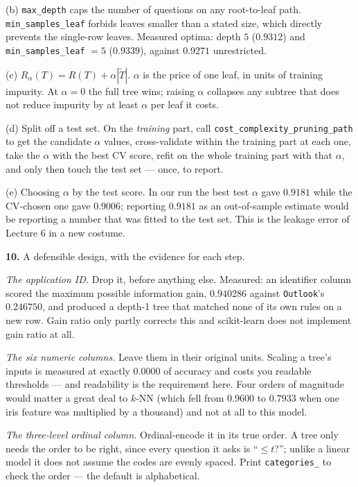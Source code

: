 \documentclass[11pt]{article}
\begin{document}
(b) \texttt{max\_depth} caps the number of questions on any root-to-leaf path.
\texttt{min\_samples\_leaf} forbids leaves smaller than a stated size, which
directly prevents the single-row leaves. Measured optima: depth $5$
($0.9312$) and \texttt{min\_samples\_leaf} $= 5$ ($0.9339$), against $0.9271$
unrestricted.

(c) $R_\alpha(T) = R(T) + \alpha|\widetilde{T}|$. $\alpha$ is the price of one
leaf, in units of training impurity. At $\alpha = 0$ the full tree wins;
raising $\alpha$ collapses any subtree that does not reduce impurity by at
least $\alpha$ per leaf it costs.

(d) Split off a test set. On the \emph{training} part, call
\texttt{cost\_complexity\_pruning\_path} to get the candidate $\alpha$ values,
cross-validate within the training part at each one, take the $\alpha$ with
the best CV score, refit on the whole training part with that $\alpha$, and
only then touch the test set --- once, to report.

(e) Choosing $\alpha$ by the test score. In our run the best test $\alpha$
gave $0.9181$ while the CV-chosen one gave $0.9006$; reporting $0.9181$ as an
out-of-sample estimate would be reporting a number that was fitted to the test
set. This is the leakage error of Lecture 6 in a new costume.

\medskip
\textbf{10.} A defensible design, with the evidence for each step.

\emph{The application ID.} Drop it, before anything else. Measured: an
identifier column scored the maximum possible information gain, $0.940286$
against \texttt{Outlook}'s $0.246750$, and produced a depth-1 tree that
matched none of its own rules on a new row. Gain ratio only partly corrects
this and scikit-learn does not implement gain ratio at all.

\emph{The six numeric columns.} Leave them in their original units. Scaling a
tree's inputs is measured at exactly $0.0000$ of accuracy and costs you
readable thresholds --- and readability is the requirement here. Four orders
of magnitude would matter a great deal to $k$-NN (which fell from $0.9600$ to
$0.7933$ when one iris feature was multiplied by a thousand) and not at all to
this model.

\emph{The three-level ordinal column.} Ordinal-encode it in its true order.
A tree only needs the order to be right, since every question it asks is
``$\le t$?''; unlike a linear model it does not assume the codes are evenly
spaced. Print \texttt{categories\_} to check the order --- the default is
alphabetical.
\end{document}
